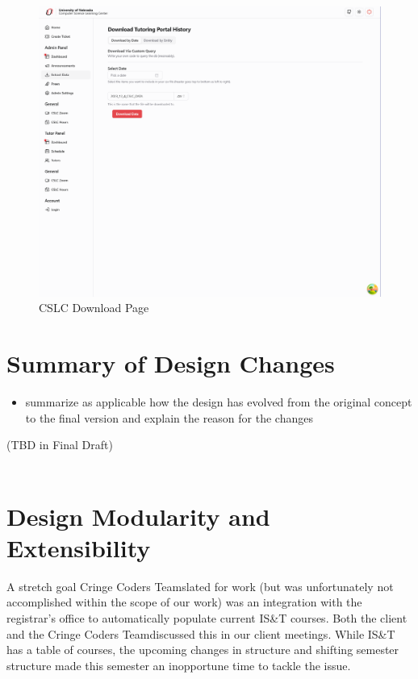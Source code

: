 \documentclass[oneside,openany,obeyspaces]{book}
\newcommand\tab[1][1cm]{\hspace*{#1}}
\newcommand\TeamName{Cringe Coders Team}
\begin{document}
\begin{flushleft}
    \begin{figure}
        \centering
        \includegraphics[width=0.75\linewidth]{img/Download.png}
        \caption{CSLC Download Page}
        \label{fig:Download Page}
    \end{figure}



    \section{Summary of Design Changes}

    \begin{itemize}
        \item summarize as applicable how the design has evolved from the original concept to the final version and explain the reason for the changes
    \end{itemize}

    \tab (TBD in Final Draft)\\~\\


    \section{Design Modularity and Extensibility}

    \tab A stretch goal \TeamName slated for work (but was unfortunately not accomplished within the scope of our work) was an integration with the registrar's office to automatically populate current IS\&T courses. Both the client and the \TeamName\space discussed this in our client meetings. While IS\&T has a table of courses, the upcoming changes in structure and shifting semester structure made this semester an inopportune time to tackle the issue.\\~\\


\end{flushleft}
\end{document}
